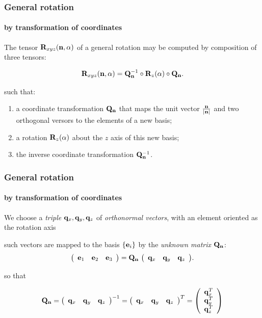 \documentclass{beamer}
\begin{document}
\begin{frame}
\frametitle{General rotation}
\framesubtitle{by transformation of coordinates}\small

The tensor  ${\bf R}_{xyz}({\bf n}, \alpha)$ of a general rotation may be computed by composition of three tensors:

\vfill

\[
{\bf R}_{xyz}({\bf n}, \alpha) =
{\bf Q}^{-1}_{{\scriptsize {\bf n}}}\circ {\bf R}_z(\alpha)\circ {\bf Q}_{{\scriptsize {\bf n}}}.
\]

\vfill

such that:

\vfill

\begin{enumerate}
\item
a coordinate transformation ${\bf Q}_{{\scriptsize {\bf n}}}$ that maps the unit vector ${\bf n}\over |{\bf n}|$ and two orthogonal versors to the elements of a new basis;

\item\vspace{-2mm}
a rotation ${\bf R}_{z}(\alpha)$ about the $z$ axis of this new basis;

\item\vspace{-2mm}
the inverse coordinate transformation ${\bf Q}^{-1}_{{\scriptsize {\bf n}}}$.
\end{enumerate}
\vfill
\end{frame}
\begin{frame}
\frametitle{General rotation}
\framesubtitle{by transformation of coordinates}\small

We choose a \emph{triple} ${\bf q}_x, {\bf q}_y, {\bf q}_z$ of \emph{orthonormal vectors},  with an element oriented as the rotation axis
\vfill

such vectors are mapped to the basis $\{{{\bf e}}_i\}$ by the \emph{unknown matrix} ${\bf Q}_{{\scriptsize {\bf n}}}$:
\[
{\left(\begin{array}{cccccccccccccccccccccccccccc}
{{\bf e}}_1 & {{\bf e}}_2 & {{\bf e}}_3
\end{array}\right)}
=
{\bf Q}_{{\scriptsize {\bf n}}}\
{\left(\begin{array}{cccccccccccccccccccccccccccc}
{\bf q}_x & {\bf q}_y & {\bf q}_z
\end{array}\right)}.
\]

so that

\[
{\bf Q}_{{\scriptsize {\bf n}}} = {\left(\begin{array}{cccccccccccccccccccccccccccc}
{\bf q}_x & {\bf q}_y & {\bf q}_z
\end{array}\right)}^{-1}
= {\left(\begin{array}{cccccccccccccccccccccccccccc}
{\bf q}_x & {\bf q}_y & {\bf q}_z
\end{array}\right)}^T
= {\left(\begin{array}{cccccccccccccccccccccccccccc}
{\bf q}_x^T \\ {\bf q}_y^T \\ {\bf q}_z^T
\end{array}\right)}
\]
\end{frame}
\end{document}
